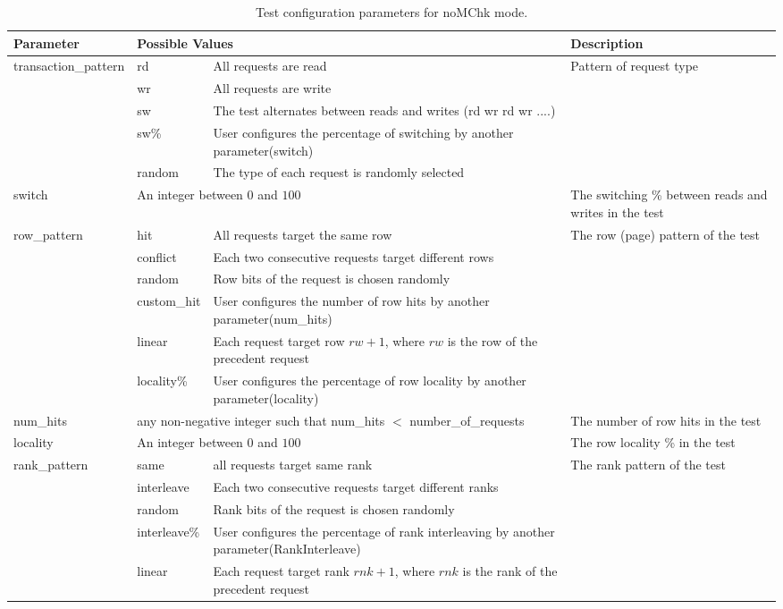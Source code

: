 \begin{table*}[ht] 
\scriptsize
\centering
\caption{Test configuration parameters for noMChk mode.\label{tb:config_noMChk}}
\begin{tabular}{|l|p{1.2cm}|p{7cm}|p{4cm}|}
  \hline
  Parameter & \multicolumn{2}{l|}{Possible Values} & Description \\
  \hline
\multirow{5}{*}{transaction\_pattern} &  rd& All requests are read & \multirow{5}{*}{Pattern of request type}\\

&wr& All requests are write&\\
&sw& The test alternates between reads and writes (rd wr rd wr ....)&\\

&sw\%& User configures the percentage of switching by another parameter(switch)&\\
&random& The type of each request is randomly selected&\\
\hline
switch & \multicolumn{2}{l|}{An integer between $0$ and $100$} & The switching \%  between reads and writes in the test\\
\hline
 \multirow{6}{*}{row\_pattern} &hit& All requests target the same row& \multirow{6}{*}{The row (page) pattern of the test}\\
 &conflict& Each two consecutive requests target different rows&\\
 &random& Row bits of the request is chosen randomly&\\
 &custom\_hit& User configures the number of row hits by another parameter(num\_hits) &\\
 &linear& Each request target row $rw+1$, where $rw$ is the row of the precedent request&\\
 &locality\%&User configures the percentage of row locality by another parameter(locality)&\\
 \hline
 num\_hits & \multicolumn{2}{l|}{any non-negative integer such that num\_hits $<$ number\_of\_requests} & The number of row hits in the test  \\
 \hline
 locality & \multicolumn{2}{l|}{An integer between $0$ and $100$} &  The row locality \% in the test\\
 
 \hline
 
 \multirow{5}{*}{rank\_pattern} & same & all requests target same rank & The rank pattern of the test\\
 
 &interleave&Each two consecutive requests target different ranks&\\
 &random&Rank bits of the request is chosen randomly&\\
 &interleave\%&User configures the percentage of rank interleaving by another parameter(RankInterleave)&\\
 &linear&Each request target rank $rnk+1$, where $rnk$ is the rank of the precedent request&\\
 

\end{tabular}
\end{table*}
